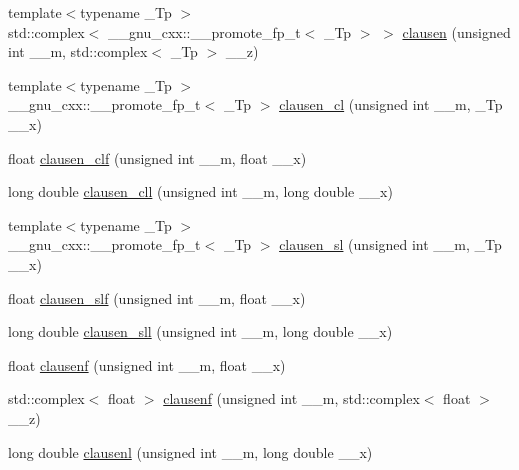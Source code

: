 \begin{DoxyCompactItemize}
\item 
{\footnotesize template$<$typename \+\_\+\+Tp $>$ }\\std\+::complex$<$ \+\_\+\+\_\+gnu\+\_\+cxx\+::\+\_\+\+\_\+promote\+\_\+fp\+\_\+t$<$ \+\_\+\+Tp $>$ $>$ \hyperlink{group__gnu__math__spec__func_ga437d2381d7fe35784bfbac594cebfe5c}{clausen} (unsigned int \+\_\+\+\_\+m, std\+::complex$<$ \+\_\+\+Tp $>$ \+\_\+\+\_\+z)
\item 
{\footnotesize template$<$typename \+\_\+\+Tp $>$ }\\\+\_\+\+\_\+gnu\+\_\+cxx\+::\+\_\+\+\_\+promote\+\_\+fp\+\_\+t$<$ \+\_\+\+Tp $>$ \hyperlink{group__gnu__math__spec__func_gaf5b819dba52683de1869f5f788114dfe}{clausen\+\_\+cl} (unsigned int \+\_\+\+\_\+m, \+\_\+\+Tp \+\_\+\+\_\+x)
\item 
float \hyperlink{group__gnu__math__spec__func_ga5e1bf6c24eb4359ffacb49da62f0838b}{clausen\+\_\+clf} (unsigned int \+\_\+\+\_\+m, float \+\_\+\+\_\+x)
\item 
long double \hyperlink{group__gnu__math__spec__func_gab06f3c94f96538167147f028711903a9}{clausen\+\_\+cll} (unsigned int \+\_\+\+\_\+m, long double \+\_\+\+\_\+x)
\item 
{\footnotesize template$<$typename \+\_\+\+Tp $>$ }\\\+\_\+\+\_\+gnu\+\_\+cxx\+::\+\_\+\+\_\+promote\+\_\+fp\+\_\+t$<$ \+\_\+\+Tp $>$ \hyperlink{group__gnu__math__spec__func_gabd032e35b1c37ec5e0ba1494e35d590d}{clausen\+\_\+sl} (unsigned int \+\_\+\+\_\+m, \+\_\+\+Tp \+\_\+\+\_\+x)
\item 
float \hyperlink{group__gnu__math__spec__func_gadd92821afcbfbdc79496b091b12a357f}{clausen\+\_\+slf} (unsigned int \+\_\+\+\_\+m, float \+\_\+\+\_\+x)
\item 
long double \hyperlink{group__gnu__math__spec__func_ga227d105b4c0659c4402de7217bb9b65b}{clausen\+\_\+sll} (unsigned int \+\_\+\+\_\+m, long double \+\_\+\+\_\+x)
\item 
float \hyperlink{group__gnu__math__spec__func_ga6422bdec1a3c930fb1623094cd2eaff2}{clausenf} (unsigned int \+\_\+\+\_\+m, float \+\_\+\+\_\+x)
\item 
std\+::complex$<$ float $>$ \hyperlink{group__gnu__math__spec__func_ga98b5ba1e5de4ef2e0e9422ac8d9ce2ad}{clausenf} (unsigned int \+\_\+\+\_\+m, std\+::complex$<$ float $>$ \+\_\+\+\_\+z)
\item 
long double \hyperlink{group__gnu__math__spec__func_ga33132bab39c8d78dde807b45fc06de52}{clausenl} (unsigned int \+\_\+\+\_\+m, long double \+\_\+\+\_\+x)
\item 

\end{DoxyCompactItemize}
